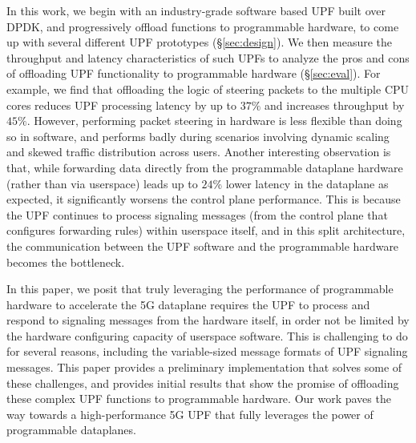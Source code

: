 In this work, we begin with an industry-grade software based UPF built over DPDK, and progressively offload functions to programmable hardware, to come up with several different UPF prototypes (\S\ref{sec:design}). We then measure the throughput and latency characteristics of such UPFs to analyze the pros and cons of offloading UPF functionality to programmable hardware (\S\ref{sec:eval}). For example, we find that offloading the logic of steering packets to the multiple CPU cores reduces UPF processing latency by up to $37 \%$ and increases throughput by $45 \%$. However, performing packet steering in hardware is less flexible than doing so in software, and performs badly during scenarios involving dynamic scaling and skewed traffic distribution across users. Another interesting observation is that, while forwarding data directly from the programmable dataplane hardware (rather than via userspace) leads up to $24$\% lower latency in the dataplane as expected, it significantly worsens the control plane performance. This is because the UPF continues to process signaling messages (from the control plane that configures forwarding rules) within userspace itself, and in this split architecture, the communication between the UPF software and the programmable hardware becomes the bottleneck.\texttt{}

In this paper, we posit that truly leveraging the performance of programmable hardware to accelerate the 5G dataplane requires the UPF to process and respond to signaling messages from the hardware itself, in order not be limited by the hardware configuring capacity of userspace software. This is challenging to do for several reasons, including the variable-sized message formats of UPF signaling messages. This paper provides a preliminary implementation that solves some of these challenges, and provides initial results that show the promise of offloading these complex UPF functions to programmable hardware. Our work paves the way towards a high-performance 5G UPF that fully leverages the power of programmable dataplanes. 


